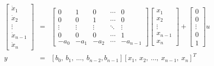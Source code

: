 \begin{slide}
\label{slide:l5s6} 
\begin{eqnarray*} \left[\begin{array}{c}
  \dot{x}_{1} \\
  \dot{x}_{2} \\
  \vdots \\
  \dot{x}_{n-1} \\
  \dot{x}_n
\end{array}\right] &=& \left[\begin{array}{ccccc}
  0 & 1 & 0 & \cdots & 0 \\
  0 & 0 & 1 & \cdots & 0 \\
  \vdots & \vdots & \vdots & \ddots & \vdots \\
  0 & 0 & 0 & \cdots & 1 \\
  -a_{0} & -a_{1} & -a_{2} & \cdots & -a_{n-1}
\end{array}\right]\left[\begin{array}{c}
  {x}_{1} \\
  {x}_{2} \\
  \vdots \\
  {x}_{n-1} \\
  {x}_{n}
\end{array}\right]+\left[\begin{array}{c}
  0 \\
  0 \\
  \vdots \\
  0 \\
  1
\end{array}\right]u\\
y & = & [b_0,\ b_1,\ \dots,\ b_{n-2}, b_{n-1}][
  {x}_{1},\
  {x}_{2},\
  \ldots,\
  {x}_{n-1},\
  {x}_{n}]^T
\end{eqnarray*}
\end{slide}
